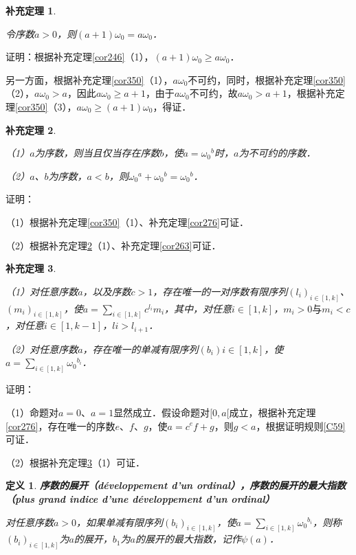 \documentclass[12pt, a4paper, oneside]{book}
\newtheorem{cor}{补充定理}
\newtheorem{de}{定义}
\begin{document}
			\begin{cor}\label{cor351}
				\hfill\par
				令序数$a>0$，则$(a+1)\omega_0=a\omega_0$．
			\end{cor}
			证明：根据补充定理\ref{cor246}（1），$(a+1)\omega_0\geq a\omega_0$．
			\par
			另一方面，根据补充定理\ref{cor350}（1），$a\omega_0$不可约，同时，根据补充定理\ref{cor350}（2），$a\omega_0>a$，因此$a\omega_0\geq a+1$，由于$a\omega_0$不可约，故$a\omega_0>a+1$，根据补充定理\ref{cor350}（3），$a\omega_0\geq (a+1)\omega_0$，得证．
			
			\begin{cor}\label{cor352}
				\hfill\par
				（1）$a$为序数，则当且仅当存在序数$b$，使$a={\omega_0}^b$时，$a$为不可约的序数．
				\par
				（2）$a$、$b$为序数，$a<b$，则${\omega_0}^a+{\omega_0}^b={\omega_0}^b$．
			\end{cor}
			证明：
			\par
			（1）根据补充定理\ref{cor350}（1）、补充定理\ref{cor276}可证．
			\par
			（2）根据补充定理\ref{cor352}（1）、补充定理\ref{cor263}可证．
			
			\begin{cor}\label{cor353}
				\hfill\par
				（1）对任意序数$a$，以及序数$c>1$，存在唯一的一对序数有限序列$(l_i)_{i\in [1, k]}$、$(m_i)_{i\in [1, k]}$，使$a=\sum\limits_{i\in [1, k]}c^{l_i}m_i$，其中，对任意$i\in [1, k]$，$m_i>0\text{与}m_i<c$，对任意$i\in [1, k-1]$，$li>l_{i+1}$．
				\par
				（2）对任意序数$a$，存在唯一的单减有限序列$(b_i)i\in [1, k]$，使$a=\sum\limits_{i\in [1, k]}{\omega_0}^{b_i}$．
			\end{cor}
			证明：
			\par
			（1）命题对$a=0$、$a=1$显然成立．假设命题对$[0, a[$成立，根据补充定理\ref{cor276}，存在唯一的序数$e$、$f$、$g$，使$a=c^ef+g$，则$g<a$，根据证明规则\ref{C59}可证．
			\par
			（2）根据补充定理\ref{cor353}（1）可证．
			
			\begin{de}
				\textbf{序数的展开（développement d'un ordinal），序数的展开的最大指数（plus grand indice d'une développement d'un ordinal）}
				\par
				对任意序数$a>0$，如果单减有限序列$(b_i)_{i\in [1, k]}$，使$a=\sum\limits_{i\in [1, k]}{\omega_0}^{b_i}$，则称$(b_i)_{i\in [1, k]}$为$a$的展开，$b_1$为$a$的展开的最大指数，记作$\psi(a)$．
			\end{de}
			
\end{document}
